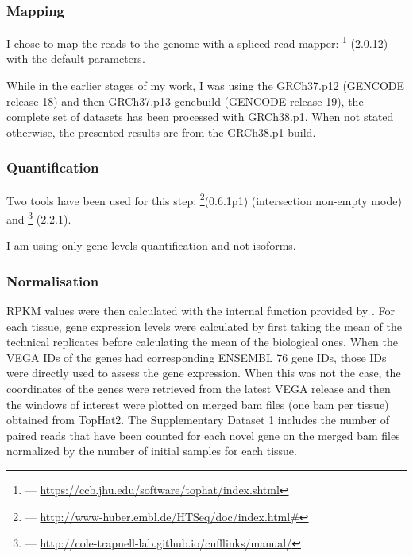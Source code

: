\subsubsection{Mapping}
I chose to map the reads to the  genome with a spliced
read mapper: \footnote{ ---
\href{https://ccb.jhu.edu/software/tophat/index.shtml}%
{https://ccb.jhu.edu/software/tophat/index.shtml}} (2.0.12) with the default
parameters.

While in the earlier stages of my work, I was using the GRCh37.p12
(GENCODE release 18) and then GRCh37.p13 genebuild (GENCODE release 19),
the complete set of datasets has been processed with GRCh38.p1.
When not stated otherwise, the presented results are from the GRCh38.p1 build.

\subsubsection{Quantification}
Two tools have been used for this step: \footnote{%
 --- \href{http://www-huber.embl.de/HTSeq/doc/index.html\#}%
{http://www-huber.embl.de/HTSeq/doc/index.html\#}}(0.6.1p1) (intersection
non-empty mode) and \footnote{ ---
\href{http://cole-trapnell-lab.github.io/cufflinks/manual/}%
{http://cole-trapnell-lab.github.io/cufflinks/manual/}} (2.2.1).

I am using only gene levels quantification and not isoforms.

\subsubsection{Normalisation}
\gls{RPKM}
values were then calculated with the internal function provided by \irap. For each
tissue, gene expression levels were calculated by first taking the mean of the
technical replicates before calculating the mean of the biological ones. When the
VEGA IDs of the genes had corresponding ENSEMBL 76 gene IDs, those IDs were
directly used to assess the gene expression. When this was not the case, the
coordinates of the genes were retrieved from the latest VEGA release and then the
windows of interest were plotted on merged bam files (one bam per tissue)
obtained from TopHat2. The Supplementary Dataset 1 includes the number of
paired reads that have been counted for each novel gene on the merged bam files
normalized by the number of initial samples for each tissue.



